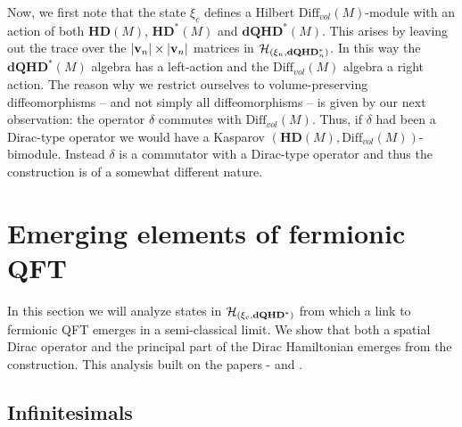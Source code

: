 \documentclass[12pt]{article}
\def\d{\delta}
\def\ch{{\cal H}}
\begin{document}
Now, we first note that the state $\xi_c$ defines a Hilbert $\mbox{Diff}_{vol}(M)$-module with an action of both $\mathbf{HD}(M)$, $\mathbf{HD}^*(M)$ and $\mathbf{dQHD}^*(M)$. This arises by leaving out the trace over the ${\vert {\bf v}_n\vert \times \vert {\bf v}_n\vert}$ matrices in $\ch_{(\xi_n,\mathbf{dQHD}^*_n)}$. In this way the $\mathbf{dQHD}^*(M)$ algebra has a left-action and the $\mbox{Diff}_{vol}(M)$ algebra a right action. The reason why we restrict ourselves to volume-preserving diffeomorphisms -- and not simply all diffeomorphisms -- is given by our next observation: the operator $\d$ commutes with $\mbox{Diff}_{vol}(M)$. Thus, if $\d$ had been a Dirac-type operator we would have a Kasparov $(\mathbf{HD}(M),\mbox{Diff}_{vol}(M))$-bimodule.  Instead $\d$ is a commutator with a Dirac-type operator and thus the construction is of a somewhat different nature. 

 

















\section{Emerging elements of fermionic QFT}


In this section we will analyze states in $\ch_{(\xi_c,\mathbf{dQHD}^*)}$ from which a link to fermionic QFT emerges in a semi-classical limit. We show that both a spatial Dirac operator and the principal part of the Dirac Hamiltonian emerges from the construction. This analysis built on the papers \cite{Aastrup:2009dy}-\cite{Aastrup:2011dt} and \cite{AGNP1}.




\subsection{Infinitesimals}
\end{document}
